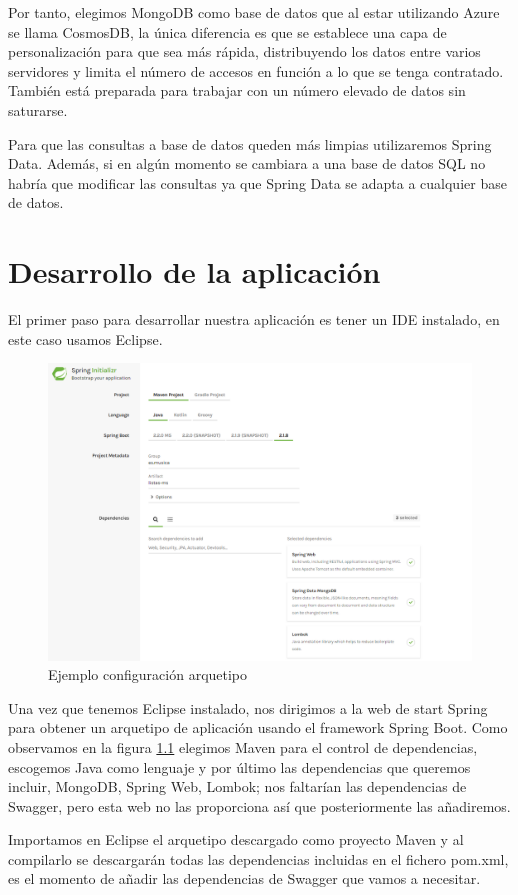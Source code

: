 \documentclass[12pt]{report} %
\begin{document}
Por tanto, elegimos MongoDB como base de datos que al estar utilizando Azure se llama CosmosDB, la única diferencia es que se establece una capa de personalización para que sea más rápida, distribuyendo los datos entre varios servidores y limita el número de accesos en función a lo que se tenga contratado. También está preparada para trabajar con un número elevado de datos sin saturarse.

Para que las consultas a base de datos queden más limpias utilizaremos Spring Data. Además, si en algún momento se cambiara a una base de datos SQL no habría que modificar las consultas ya que Spring Data se adapta a cualquier base de datos.

\chapter{Desarrollo de la aplicación}

El primer paso para desarrollar nuestra aplicación es tener un IDE instalado, en este caso usamos Eclipse.

\begin{figure}
	\centering
	\includegraphics[width=0.7\linewidth]{imagenes/arquetipo}
	\caption{Ejemplo configuración arquetipo}
	\label{fig:arquetipo}
\end{figure}

Una vez que tenemos Eclipse instalado, nos dirigimos a la web de start Spring \cite{startSpring} para obtener un arquetipo de aplicación usando el framework Spring Boot. Como observamos en la figura \ref{fig:arquetipo} elegimos Maven para el control de dependencias, escogemos Java como lenguaje y por último las dependencias que queremos incluir, MongoDB, Spring Web, Lombok; nos faltarían las dependencias de Swagger, pero esta web no las proporciona así que posteriormente las añadiremos.

Importamos en Eclipse el arquetipo descargado como proyecto Maven y al compilarlo se descargarán todas las dependencias incluidas en el fichero pom.xml, es el momento de añadir las dependencias de Swagger que vamos a necesitar.
\end{document}
